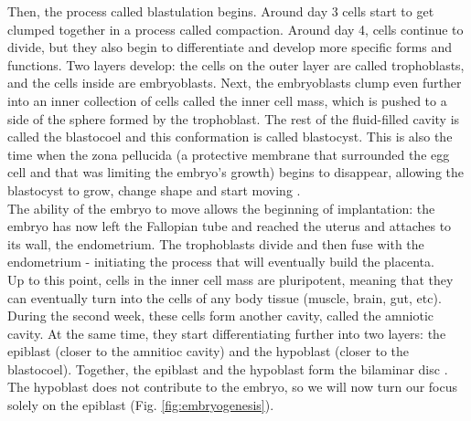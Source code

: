 Then, the process called blastulation begins.
Around day 3 cells start to get clumped together in a process called compaction.
Around day 4, cells continue to divide, but they also begin to differentiate and develop more specific forms and functions.
Two layers develop: the cells on the outer layer are called trophoblasts, and the cells inside are embryoblasts. 
Next, the embryoblasts clump even further into an inner collection of cells called the inner cell mass, which is pushed to a side of the sphere formed by the trophoblast.
The rest of the fluid-filled cavity is called the blastocoel and this conformation is called blastocyst.
This is also the time when the zona pellucida (a protective membrane that surrounded the egg cell and that was limiting the embryo's growth) begins to disappear, allowing the blastocyst to grow, change shape and start moving \cite{larsen2001human}.\\

The ability of the embryo to move allows the beginning of implantation: the embryo has now left the Fallopian tube and reached the uterus and attaches to its wall, the endometrium.
The trophoblasts divide and then fuse with the endometrium -
initiating the process that 
will eventually build the placenta.\\

Up to this point, cells in the inner cell mass are pluripotent, meaning that they can eventually turn into the cells of any body tissue (muscle, brain, gut, etc). 
During the second week, these cells form another cavity, called the amniotic cavity. 
At the same time, they start differentiating further into two layers: the epiblast (closer to the amnitioc cavity) and the hypoblast (closer to the blastocoel). 
Together, the epiblast and the hypoblast form the bilaminar disc \cite{larsen2001human}.
The hypoblast does not contribute to the embryo, so we will now turn our focus solely on the epiblast (Fig. \ref{fig:embryogenesis}).\\

